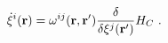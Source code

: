 \begin{equation}
\dot{\xi}^{i}({\bf r})=\omega ^{ij}({\bf r},{\bf r^{\prime }})\frac{\delta }{%
\delta \xi ^{j}({\bf r^{\prime })}}H_{C}\ .  \label{FJ}
\end{equation}%
